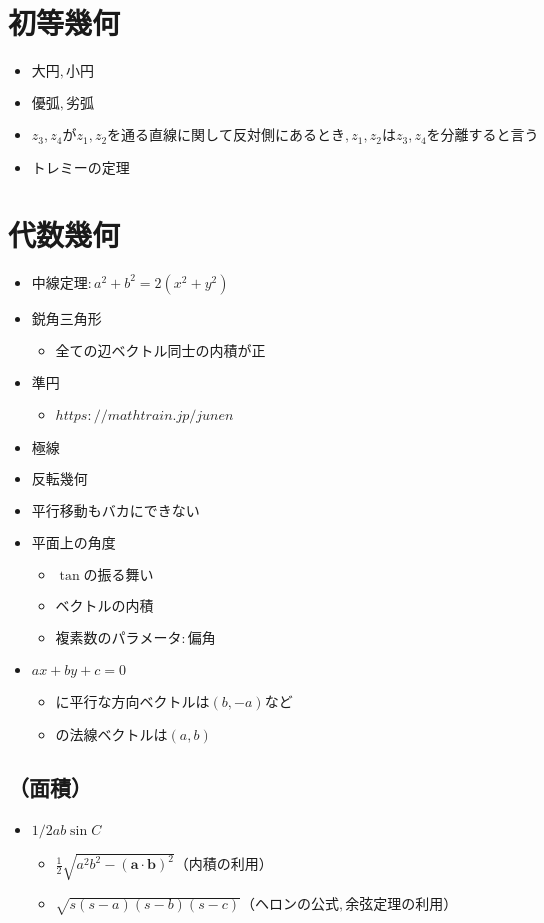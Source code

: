 \documentclass[dvipdfmx,uplatex]{jsarticle}
\begin{document}
\section{初等幾何}
\begin{itemize}
	\item $ 大円,小円$
	\item $ 優弧,劣弧$
	\item $ z_3,z_4がz_1,z_2を通る直線に関して反対側にあるとき,z_1,z_2はz_3,z_4を分離すると言う$
	\item $ トレミーの定理$
\end{itemize}

\section{代数幾何}
\begin{itemize}
	\item $ 中線定理: a^2+b^2 = 2(x^2+y^2)$
	\item $ 鋭角三角形$
	\begin{itemize}
		\item $ 全ての辺ベクトル同士の内積が正$
	\end{itemize}
	\item $ 準円$
	\begin{itemize}
		\item $ https://mathtrain.jp/junen$
	\end{itemize}
	\item $ 極線$
	\item $ 反転幾何$
	\item $ 平行移動もバカにできない$
	\item $ 平面上の角度$
	\begin{itemize}
		\item $ \tan の振る舞い$
		\item $ ベクトルの内積$
		\item $ 複素数のパラメータ:偏角$
	\end{itemize}
	\item $ ax+by+c=0$
	\begin{itemize}
		\item $ に平行な方向ベクトルは(b,-a)など$
		\item $ の法線ベクトルは(a,b)$
	\end{itemize}
\end{itemize}
\subsection{（面積）}
\begin{itemize}
	\item $ 1/2ab \sin C$
	\begin{itemize}
		\item $ \frac{1}{2} \sqrt{a^2b^2 - (\bm{a} \cdot \bm{b})^2} （内積の利用）$
		\item $ \sqrt{s(s-a)(s-b)(s-c)} （ヘロンの公式,余弦定理の利用）$
	\end{itemize}
\end{itemize}
\end{document}
